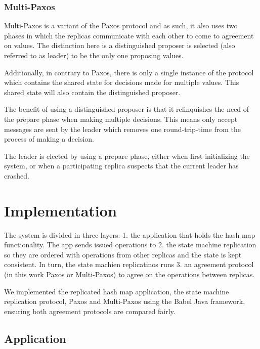 \documentclass[sigconf]{acmart}
\begin{document}
\subsubsection{Multi-Paxos}


Multi-Paxos is a variant of the Paxos protocol and as such, it also uses two phases in which the replicas communicate with each other to come to agreement on values. The distinction here is a distinguished proposer is selected (also referred to as leader) to be the only one proposing values.

Additionally, in contrary to Paxos, there is only a single instance of the protocol which contains the shared state for decisions made for multiple values. This shared state will also contain the distinguished proposer. 

The benefit of using a distinguished proposer is that it relinquishes the need of the prepare phase when making multiple decisions. This means only accept messages are sent by the leader which removes one round-trip-time from the process of making a decision.

The leader is elected by using a prepare phase, either when first initializing the system, or when a participating replica suspects that the current leader has crashed.


\section{Implementation}

The system is divided in three layers: 1. the application that holds the hash map functionality. The app sends issued operations to 2. the state machine replication so they are ordered with operations from other replicas and the state is kept consistent. In turn, the state machien replicatinos runs 3. an agreement protocol (in this work Paxos or Multi-Paxos) to agree on the operations between replicas. 

We implemented the replicated hash map application, the state machine replication protocol, Paxos and Multi-Paxos using the Babel Java framework, ensuring both agreement protocols are compared fairly.

\subsection{Application}
\end{document}
